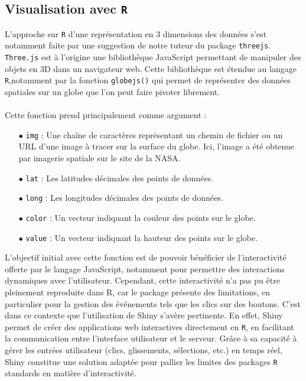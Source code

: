 \documentclass[12pt]{article}
\begin{document}
\subsection{Visualisation avec \texttt{R}}
L'approche sur \texttt{R} d'une représentation en 3 dimensions des données s'est notamment faite par une suggestion de notre tuteur du package \texttt{threejs}. \texttt{Three.js} est à l'origine une bibliothèque JavaScript permettant de manipuler des objets en 3D dans un navigateur web. Cette bibliothèque est étendue au langage \texttt{R},notamment par la fonction \texttt{globejs()} qui permet de représenter des données spatiales sur un globe que l'on peut faire pivoter librement.\\
\\
Cette fonction prend principalement comme argument :\\
\begin{itemize}
    \item[$\bullet$] \texttt{img} : Une chaîne de caractères représentant un chemin de fichier ou un URL d'une image à tracer sur la surface du globe. Ici, l'image a été obtenue par imagerie spatiale sur le site de la NASA.
    \item[$\bullet$] \texttt{lat} : Les latitudes décimales des points de données.
    \item[$\bullet$] \texttt{long} : Les longitudes décimales des points de données.
    \item[$\bullet$] \texttt{color} : Un vecteur indiquant la couleur des points sur le globe.
    \item[$\bullet$] \texttt{value} : Un vecteur indiquant la hauteur des points sur le globe.\\
\end{itemize}
\vspace{0.3cm}
L’objectif initial avec cette fonction est de pouvoir bénéficier de l’interactivité offerte par le langage JavaScript, notamment pour permettre des interactions dynamiques avec l’utilisateur. Cependant, cette interactivité n’a pas pu être pleinement reproduite dans R, car le package présente des limitations, en particulier pour la gestion des événements tels que les clics sur des boutons. C’est dans ce contexte que l’utilisation de Shiny s'avère pertinente. En effet, Shiny permet de créer des applications web interactives directement en \texttt{R}, en facilitant la communication entre l’interface utilisateur et le serveur. Grâce à sa capacité à gérer les entrées utilisateur (clics, glissements, sélections, etc.) en temps réel, Shiny constitue une solution adaptée pour pallier les limites des packages \texttt{R} standards en matière d’interactivité.\\
\end{document}
